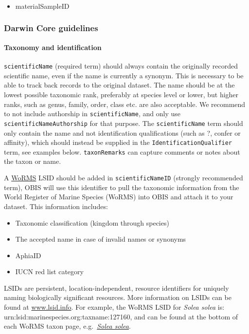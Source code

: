 \documentclass[
  letterpaper,
  DIV=11,
  numbers=noendperiod,
  oneside]{scrreprt}
\let\oldparagraph\paragraph
\renewcommand{\paragraph}[1]{\oldparagraph{#1}\mbox{}}
\providecommand{\tightlist}{%
  \setlength{\itemsep}{0pt}\setlength{\parskip}{0pt}}\usepackage{longtable,booktabs,array}
\begin{document}
\begin{itemize}
\tightlist
\item
  materialSampleID
\end{itemize}

\hypertarget{darwin-core-guidelines}{%
\subsubsection{Darwin Core guidelines}\label{darwin-core-guidelines}}

\hypertarget{taxonomy-and-identification}{%
\paragraph{Taxonomy and
identification}\label{taxonomy-and-identification}}

\texttt{scientificName} (required term) should always contain the
originally recorded scientific name, even if the name is currently a
synonym. This is necessary to be able to track back records to the
original dataset. The name should be at the lowest possible taxonomic
rank, preferably at species level or lower, but higher ranks, such as
genus, family, order, class etc. are also acceptable. We recommend to
not include authorship in \texttt{scientificName}, and only use
\texttt{scientificNameAuthorship} for that purpose. The
\texttt{scientificName} term should only contain the name and not
identification qualifications (such as ?, confer or affinity), which
should instead be supplied in the \texttt{IdentificationQualifier} term,
see examples below. \texttt{taxonRemarks} can capture comments or notes
about the taxon or name.

A \href{http://www.marinespecies.org/}{WoRMS} LSID should be added in
\texttt{scientificNameID} (strongly recommended term), OBIS will use
this identifier to pull the taxonomic information from the World
Register of Marine Species (WoRMS) into OBIS and attach it to your
dataset. This information includes:

\begin{itemize}
\tightlist
\item
  Taxonomic classification (kingdom through species)
\item
  The accepted name in case of invalid names or synonyms
\item
  AphiaID
\item
  IUCN red list category
\end{itemize}

LSIDs are persistent, location-independent, resource identifiers for
uniquely naming biologically significant resources. More information on
LSIDs can be found at \href{http://www.lsid.info/}{www.lsid.info}. For
example, the WoRMS LSID for \emph{Solea solea} is:
urn:lsid:marinespecies.org:taxname:127160, and can be found at the
bottom of each WoRMS taxon page,
e.g.~\href{http://marinespecies.org/aphia.php?p=taxdetails\&id=127160}{\emph{Solea
solea}}.
\end{document}
